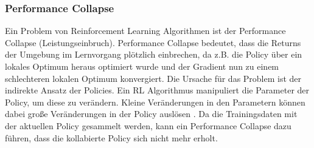 \subsubsection{Performance Collapse}
Ein Problem von Reinforcement Learning Algorithmen ist der Performance Collapse (Leistungseinbruch). Performance Collapse bedeutet, dass die Returns der Umgebung im Lernvorgang plötzlich einbrechen, da z.B. die Policy über ein lokales Optimum heraus optimiert wurde und der Gradient nun zu einem schlechteren lokalen Optimum konvergiert. Die Ursache für das Problem ist der indirekte Ansatz der Policies. Ein RL Algorithmus manipuliert die Parameter der Policy, um diese zu verändern. Kleine Veränderungen in den Parametern können dabei große Veränderungen in der Policy auslösen \cite{FoundationsDeepRL}. Da die Trainingsdaten mit der aktuellen Policy gesammelt werden, kann ein Performance Collapse dazu führen, dass die kollabierte Policy sich nicht mehr erholt. 



